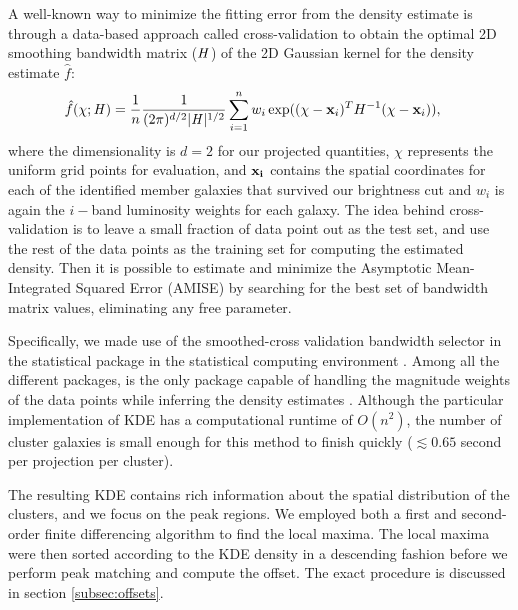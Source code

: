 A well-known way to minimize the fitting error from the density estimate is through
a data-based approach called cross-validation to obtain 
the optimal 2D smoothing
bandwidth matrix ($\mathbf{\it H}$) of the 2D Gaussian kernel for the
density estimate $\hat{f}$:
\begin{align}
	\hat{f}(\chi; \mathbf{\it H}) &= \frac{1}{n} \frac{1}{(2\pi)^{d/2}|\mathbf{\it H}|^{1/2}}
	\sum_{i=1}^n w_i \exp((\chi-{\bf x}_i)^T H^{-1} (\chi-{\bf x}_i)),
	\label{eq:cross_validated_bandwidth}
\end{align}
where the dimensionality is $d=2$ for our projected quantities,
$\chi$ represents the uniform grid points for evaluation, and 
$\bf{x}_i$ contains the spatial coordinates for each of the identified member 
galaxies that survived our brightness cut and $w_i$ is again the $i-$band
luminosity weights for each galaxy.
The idea behind cross-validation is to leave a small fraction of data point 
out as the test set, and use the rest of the data points as 
the training set for computing the estimated density.
Then it is possible to estimate and minimize the Asymptotic Mean-Integrated Squared Error
(AMISE)  by searching
for the best set of bandwidth matrix values, eliminating any free parameter. 

Specifically, we made use of the smoothed-cross validation \citep{Hall1992} 
bandwidth selector in the statistical package {} \citep{Duong2007} 
in the {} statistical computing environment \citep{R_core}. 
Among all the different {} packages, {} is the
only package capable of handling the magnitude weights of the data points 
while inferring the density estimates \citep{Deng2011}. 
Although the particular implementation of KDE has a computational runtime of $O(n^2)$, 
the number of cluster galaxies is
small enough for this method to finish quickly ($\lesssim 0.65$ second per
projection per cluster). 

The resulting KDE contains rich information about the spatial distribution of
the clusters, and we focus on the peak regions.  
We employed both a first and second-order  
finite differencing algorithm to find the local maxima.  
The local maxima were then sorted according to the KDE density in a descending
fashion before we perform peak matching and compute the offset. The exact
procedure is discussed in section \ref{subsec:offsets}. 

